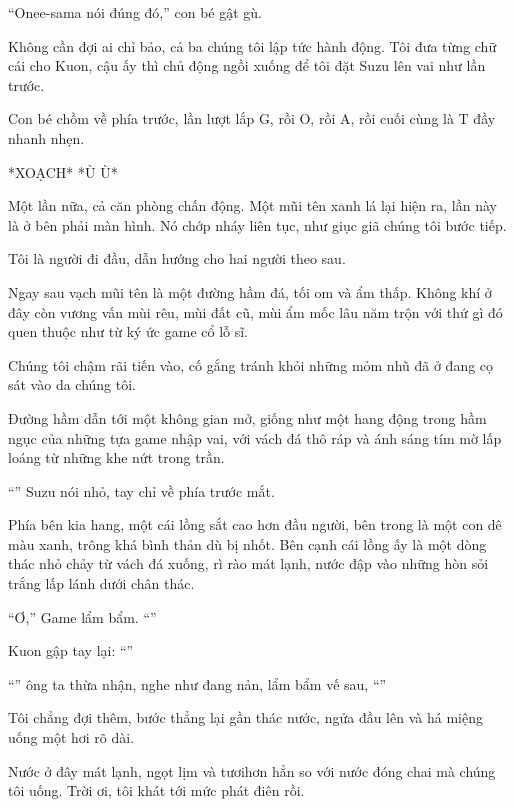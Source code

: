 \documentclass[../main.tex]{subfiles}
\begin{document}
``Onee-sama nói đúng đó,'' con bé gật gù.

Không cần đợi ai chỉ bảo, cả ba chúng tôi lập tức hành động. Tôi đưa từng chữ cái cho Kuon, cậu ấy thì chủ động ngồi xuống để tôi đặt Suzu lên vai như lần trước.

Con bé chồm về phía trước, lần lượt lắp G, rồi O, rồi A, rồi cuối cùng là T đầy nhanh nhẹn.

*XOẠCH* *Ù Ù*

Một lần nữa, cả căn phòng chấn động. Một mũi tên xanh lá lại hiện ra, lần này là ở bên phải màn hình. Nó chớp nháy liên tục, như giục giã chúng tôi bước tiếp.

Tôi là người đi đầu, dẫn hướng cho hai người theo sau.

Ngay sau vạch mũi tên là một đường hầm đá, tối om và ẩm thấp. Không khí ở đây còn vương vấn mùi rêu, mùi đất cũ, mùi ẩm mốc lâu năm trộn với thứ gì đó quen thuộc như từ ký ức game cổ lỗ sĩ.

Chúng tôi chậm rãi tiến vào, cố gắng tránh khỏi những mỏm nhũ đã ở đang cọ sát vào da chúng tôi.

Đường hầm dẫn tới một không gian mở, giống như một hang động trong hầm ngục của những tựa game nhập vai, với vách đá thô ráp và ánh sáng tím mờ lấp loáng từ những khe nứt trong trần.

``'' Suzu nói nhỏ, tay chỉ về phía trước mắt.

Phía bên kia hang, một cái lồng sắt cao hơn đầu người, bên trong là một con dê màu xanh, trông khá bình thản dù bị nhốt. Bên cạnh cái lồng ấy là một dòng thác nhỏ chảy từ vách đá xuống, rì rào mát lạnh, nước đập vào những hòn sỏi trắng lấp lánh dưới chân thác.


``Ơ,'' Game lẩm bẩm. ``''

Kuon gập tay lại: ``''

``'' ông ta thừa nhận, nghe như đang nản, lẩm bẩm vế sau, ``''

Tôi chẳng đợi thêm, bước thẳng lại gần thác nước, ngửa đầu lên và há miệng uống một hơi rõ dài.

Nước ở đây mát lạnh, ngọt lịm và tươihơn hẳn so với nước đóng chai mà chúng tôi uống. Trời ơi, tôi khát tới mức phát điên rồi.
\end{document}
